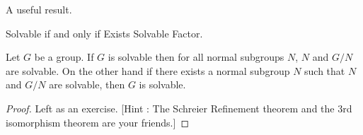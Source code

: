 \documentclass[../../book.tex]{subfiles}
\begin{document}
A useful result.
\begin{lem} Solvable if and only if Exists Solvable Factor.
    
    Let $G$ be a group.
    If $G$ is solvable then for all normal subgroups $N$,
    $N$ and $G / N$ are solvable.
    On the other hand if there exists a normal subgroup $N$ such that 
    $N$ and $G / N$ are solvable,
    then $G$ is solvable.
    
\end{lem}
\begin{proof}
    
    Left as an exercise. 
    [Hint : The Schreier Refinement theorem
    and the 3rd isomorphism theorem are your friends.]
    
\end{proof}
\end{document}
